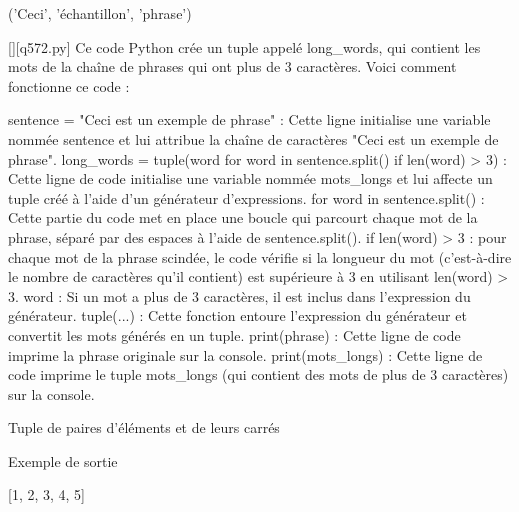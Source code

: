('Ceci', 'échantillon', 'phrase')
        \par
        \begin{solution}
            \renewcommand{\nomfichier}{q572.py}
            \pythonfile{\chemincode \nomfichier}[][\nomfichier]
            Ce code Python crée un tuple appelé long\_words, qui contient les mots de la chaîne de phrases qui ont plus de 3 caractères. Voici comment fonctionne ce code :

    sentence = "Ceci est un exemple de phrase" : Cette ligne initialise une variable nommée sentence et lui attribue la chaîne de caractères "Ceci est un exemple de phrase".
    long\_words = tuple(word for word in sentence.split() if len(word) > 3) : Cette ligne de code initialise une variable nommée mots\_longs et lui affecte un tuple créé à l'aide d'un générateur d'expressions.
        for word in sentence.split() : Cette partie du code met en place une boucle qui parcourt chaque mot de la phrase, séparé par des espaces à l'aide de sentence.split().
        if len(word) > 3 : pour chaque mot de la phrase scindée, le code vérifie si la longueur du mot (c'est-à-dire le nombre de caractères qu'il contient) est supérieure à 3 en utilisant len(word) > 3.
        word : Si un mot a plus de 3 caractères, il est inclus dans l'expression du générateur.
        tuple(...) : Cette fonction entoure l'expression du générateur et convertit les mots générés en un tuple.
    print(phrase) : Cette ligne de code imprime la phrase originale sur la console.
    print(mots\_longs) : Cette ligne de code imprime le tuple mots\_longs (qui contient des mots de plus de 3 caractères) sur la console.
        \end{solution}
        

        \question
        Tuple de paires d'éléments et de leurs carrés

Exemple de sortie

[1, 2, 3, 4, 5]

